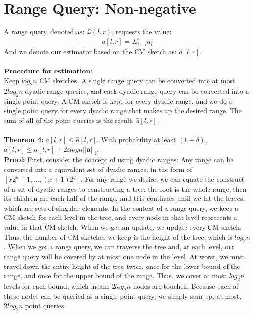 \documentclass[11pt]{article}
\begin{document}
\section{Range Query: Non-negative}
A range query, denoted as: $\mathcal{Q}(l,r)$, requests the value:
\begin{align*}
    a[l,r] = \Sigma_{i=l}^r a_i
\end{align*}
And we denote our estimator based on the CM sketch as: $\hat a[l,r]$.\\\\
    \textbf{Procedure for estimation:}\\
    Keep $log_2n$ CM sketches. A single range query can be converted into at most $2log_2n$ dyadic range queries, and each dyadic range query can be converted into a single point query. A CM sketch is kept for every dyadic range, and we do a single point query for every dyadic range that makes up the desired range. The sum of all of the point queries is the result, $\hat a[l,r]$.\\\\
    \textbf{Theorem 4: } $a[l,r] \leq \hat a[l,r]$. With probability at least $(1-\delta)$, $\hat a[l,r] \leq a[l,r] + 2\varepsilon logn ||\bm{a}||_1$.\\ 
    \textbf{Proof:} First, consider the concept of using dyadic ranges: Any range can be converted into a equivalent set of dyadic ranges, in the form of $[x2^y+1, ... , (x+1)2^y]$. For any range we desire, we can equate the construct of a set of dyadic ranges to constructing a tree: the root is the whole range, then its children are each half of the range, and this continues until we hit the leaves, which are sets of singular elements. In the context of a range query, we keep a CM sketch for each level in the tree, and every node in that level represents a value in that CM sketch. When we get an update, we update every CM sketch. Thus, the number of CM sketches we keep is the height of the tree, which is $log_2n$. When we get a range query, we can traverse the tree and, at each level, our range query will be covered by at most one node in the level. At worst, we must travel down the entire height of the tree twice, once for the lower bound of the range, and once for the upper bound of the range. Thus, we cover at most $log_2n$ levels for each bound, which means $2log_2n$ nodes are touched. Because each of these nodes can be queried as a single point query, we simply sum up, at most, $2log_2n$ point queries. \\\\
\end{document}
